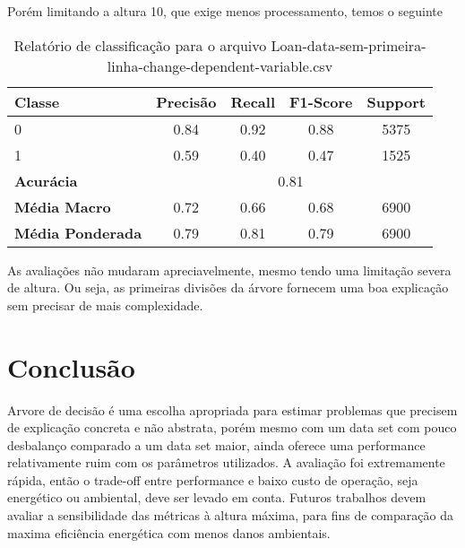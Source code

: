 \documentclass[12pt]{article}
\begin{document}
Porém limitando a altura 10, que exige menos processamento, temos o seguinte

\begin{table}[h]
	\centering
	\begin{tabular}{lcccc}
		\hline
		\textbf{Classe} & \textbf{Precisão} & \textbf{Recall} & \textbf{F1-Score} & \textbf{Support} \\ \hline
		0                & 0.84              & 0.92               & 0.88               & 5375              \\
		1                & 0.59              & 0.40               & 0.47               & 1525              \\ \hline
		\textbf{Acurácia} & \multicolumn{4}{c}{0.81} \\
		\textbf{Média Macro} & 0.72 & 0.66 & 0.68 & 6900 \\
		\textbf{Média Ponderada} & 0.79 & 0.81 & 0.79 & 6900 \\ \hline
	\end{tabular}
	\caption{Relatório de classificação para o arquivo Loan-data-sem-primeira-linha-change-dependent-variable.csv}
	\label{tab:class_report}
\end{table}

As avaliações não mudaram apreciavelmente, mesmo tendo uma limitação severa de altura. Ou seja, as primeiras divisões da árvore fornecem uma boa explicação sem precisar de mais complexidade.

\section{Conclusão}
Arvore de decisão é uma escolha apropriada para estimar problemas que precisem de explicação concreta e não abstrata, porém mesmo com um data set com pouco desbalanço comparado a um data set maior, ainda oferece uma performance relativamente ruim com os parâmetros utilizados. A avaliação foi extremamente rápida, então o trade-off entre performance e baixo custo de operação, seja energético ou ambiental, deve ser levado em conta. Futuros trabalhos devem avaliar a sensibilidade das métricas à altura máxima, para fins de comparação da maxima eficiência energética com menos danos ambientais.


\end{document}
